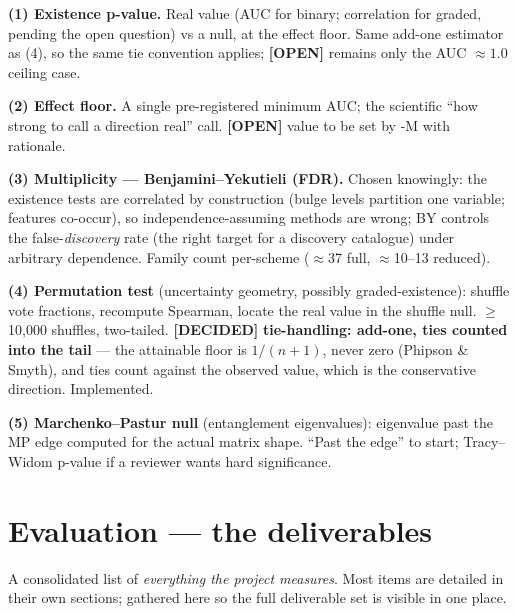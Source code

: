 \documentclass[11pt,a4paper]{article}
\newcommand{\dec}{\textcolor{decided}{\sffamily\bfseries[DECIDED]}}
\newcommand{\opn}{\textcolor{openq}{\sffamily\bfseries[OPEN]}}
\begin{document}
\begin{decidedbox}
\textbf{(1) Existence p-value.} Real value (AUC for binary; correlation for graded, pending the
open question) vs a null, at the effect floor. Same add-one estimator as (4), so the same
tie convention applies; \opn{} remains only the AUC $\approx 1.0$ ceiling case.

\textbf{(2) Effect floor.} A single pre-registered minimum AUC; the scientific
``how strong to call a direction real'' call. \opn{} value to be set by -M with rationale.

\textbf{(3) Multiplicity --- Benjamini--Yekutieli (FDR).} Chosen knowingly: the existence tests
are correlated by construction (bulge levels partition one variable; features co-occur), so
independence-assuming methods are wrong; BY controls the false-\emph{discovery} rate (the right
target for a discovery catalogue) under arbitrary dependence. Family count per-scheme
($\approx$37 full, $\approx$10--13 reduced).

\textbf{(4) Permutation test} (uncertainty geometry, possibly graded-existence): shuffle vote
fractions, recompute Spearman, locate the real value in the shuffle null. $\geq$10{,}000
shuffles, two-tailed. \dec{} \textbf{tie-handling: add-one, ties counted into the tail} --- the
attainable floor is $1/(n+1)$, never zero (Phipson \& Smyth), and ties count against the observed
value, which is the conservative direction. Implemented.

\textbf{(5) Marchenko--Pastur null} (entanglement eigenvalues): eigenvalue past the MP edge
computed for the actual matrix shape. ``Past the edge'' to start; Tracy--Widom p-value if a
reviewer wants hard significance.
\end{decidedbox}

\section{Evaluation --- the deliverables}\label{sec:eval}

A consolidated list of \emph{everything the project measures}. Most items are detailed in their
own sections; gathered here so the full deliverable set is visible in one place.
\end{document}
